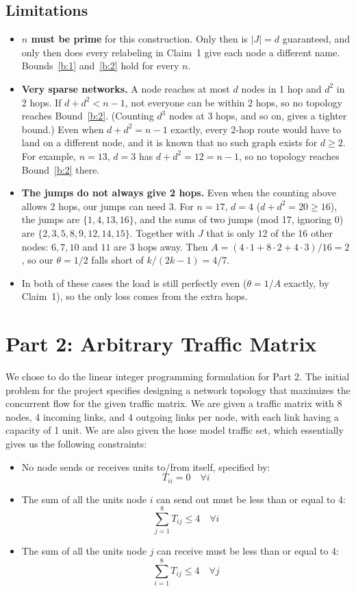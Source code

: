 \documentclass[11pt]{article}
\theoremstyle{definition}
\begin{document}
\subsection{Limitations}\label{p1:lim}
\begin{itemize}
\item \textbf{$n$ must be prime} for this construction. Only then is $|J| = d$ guaranteed, and only then does every
  relabeling in Claim~1 give each node a different name. Bounds~\ref{b:1} and~\ref{b:2} hold for every $n$.
\item \textbf{Very sparse networks.} A node reaches at most $d$ nodes in 1 hop and $d^2$ in 2 hops. If
  $d + d^2 < n-1$, not everyone can be within 2 hops, so no topology reaches Bound~\ref{b:2}. (Counting $d^3$ nodes at
  3 hops, and so on, gives a tighter bound.) Even when $d + d^2 = n-1$ exactly, every 2-hop route would have to land
  on a different node, and it is known that no such graph exists for $d \ge 2$. For example, $n=13$, $d=3$ has
  $d+d^2 = 12 = n-1$, so no topology reaches Bound~\ref{b:2} there.
\item \textbf{The jumps do not always give 2 hops.} Even when the counting above allows 2 hops, our jumps can need 3.
  For $n=17$, $d=4$ ($d+d^2 = 20 \ge 16$), the jumps are $\{1,4,13,16\}$, and the sums of two jumps (mod 17, ignoring
  $0$) are $\{2,3,5,8,9,12,14,15\}$. Together with $J$ that is only 12 of the 16 other nodes: $6, 7, 10$ and $11$ are
  3 hops away. Then $A = (4\cdot1 + 8\cdot2 + 4\cdot3)/16 = 2$, so our $\theta = 1/2$ falls short of $k/(2k-1) = 4/7$.
\item In both of these cases the load is still perfectly even ($\theta = 1/A$ exactly, by Claim~1), so the only loss
  comes from the extra hops.
\end{itemize}

\section{Part 2: Arbitrary Traffic Matrix}
We chose to do the linear integer programming formulation for Part 2. The initial problem for the project specifies designing a network topology that maximizes the concurrent flow for the given traffic matrix. We are given a traffic matrix with 8 nodes, 4 incoming links, and 4 outgoing links per node, with each link having a capacity of 1 unit. We are also given the hose model traffic set, which essentially gives us the following constraints:

\begin{itemize}
    \item No node sends or receives units to/from itself, specified by:
    \[
    T_{ii} = 0 \quad \forall i
    \]

    \item The sum of all the units node $i$ can send out must be less than or equal to 4:
    \[
    \sum_{j=1}^{8} T_{ij} \leq 4 \quad \forall i
    \]

    \item The sum of all the units node $j$ can receive must be less than or equal to 4:
    \[
    \sum_{i=1}^{8} T_{ij} \leq 4 \quad \forall j
    \]
\end{itemize}
\end{document}
